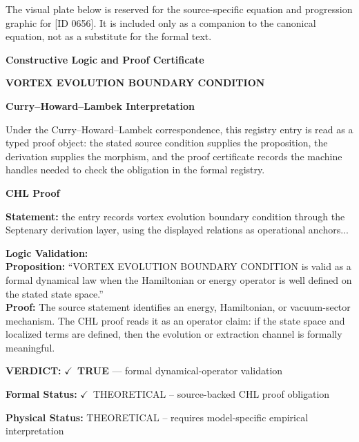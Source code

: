 \begingroup\footnotesize\sloppy
The visual plate below is reserved for the source-specific equation and progression graphic for [ID 0656]. It is included only as a companion to the canonical equation, not as a substitute for the formal text.
\par\endgroup
\ifTZPDarkEdition
{}
\fi

\clearpage
\begingroup\tzpsupportsetup
\noindent\textbf{\fontsize{10.8pt}{12.8pt}\selectfont [ID 0656] Constructive Logic and Proof Certificate}\par
\noindent\textbf{\fontsize{10pt}{12pt}\selectfont VORTEX EVOLUTION BOUNDARY CONDITION}\par
\vspace{0.45em}
\begingroup
\footnotesize
\setlength{\parskip}{0.22em}
\setlength{\parindent}{0pt}
\noindent\textbf{Curry--Howard--Lambek Interpretation}\par
Under the Curry--Howard--Lambek correspondence, this registry entry is read as a typed proof
object: the stated source condition supplies the proposition, the derivation supplies the
morphism, and the proof certificate records the machine handles needed to check the obligation
in the formal registry.

\vspace{0.45em}
\noindent\textbf{CHL Proof}\par
\textbf{Statement:} the entry records vortex evolution boundary condition through the Septenary derivation
layer, using the displayed relations as operational anchors...

\textbf{Logic Validation:}\\
\textbf{Proposition:} ``VORTEX EVOLUTION BOUNDARY CONDITION is valid as a formal dynamical law when the
Hamiltonian or energy operator is well defined on the stated state space.''\\
\textbf{Proof:} The source statement identifies an energy, Hamiltonian, or vacuum-sector mechanism. The
CHL proof reads it as an operator claim: if the state space and localized terms are
defined, then the evolution or extraction channel is formally meaningful.

\textbf{VERDICT:} \ensuremath{\checkmark}\ \textbf{TRUE} --- formal dynamical-operator validation

\textbf{Formal Status:} \ensuremath{\checkmark}\ THEORETICAL -- source-backed CHL proof obligation

\textbf{Physical Status:} THEORETICAL -- requires model-specific empirical interpretation
\par\vspace{0.45em}
\par
\ifTZPDarkEdition
{}
\fi
\endgroup
\endgroup
